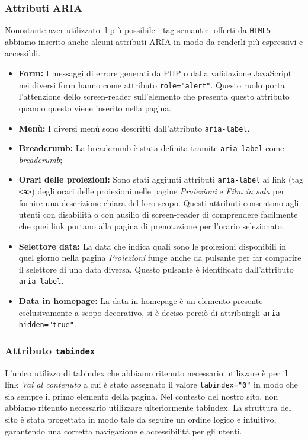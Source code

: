 \subsubsection{Attributi ARIA}
Nonostante aver utilizzato il più possibile i tag semantici offerti da \texttt{HTML5} abbiamo inserito anche alcuni attributi ARIA in modo da renderli più espressivi e accessibli.
\begin{itemize}
    \item \textbf{Form:} I messaggi di errore generati da PHP o dalla validazione JavaScript nei diversi form hanno come attributo \texttt{role="alert"}. Questo ruolo porta l'attenzione dello screen-reader sull'elemento che presenta questo attributo quando questo viene inserito nella pagina.
    \item \textbf{Menù:} I diversi menù sono descritti dall'attributo \texttt{aria-label}.
    \item \textbf{Breadcrumb:} La breadcrumb è stata definita tramite \texttt{aria-label} come \textit{breadcrumb};
    \item \textbf{Orari delle proiezioni:} Sono stati aggiunti attributi \texttt{aria-label} ai link (tag \texttt{<a>}) degli orari delle proiezioni nelle pagine \textit{Proiezioni} e \textit{Film in sala} per fornire una descrizione chiara del loro scopo. Questi attributi consentono agli utenti con disabilità o con ausilio di screen-reader di comprendere facilmente che quei link portano alla pagina di prenotazione per l'orario selezionato.
    \item \textbf{Selettore data:} La data che indica quali sono le proiezioni disponibili in quel giorno nella pagina \textit{Proiezioni} funge anche da pulsante per far comparire il selettore di una data diversa. Questo pulsante è identificato dall'attributo \texttt{aria-label}.
    \item \textbf{Data in homepage:} La data in homepage è un elemento presente esclusivamente a scopo decorativo, si è deciso perciò di attribuirgli \texttt{aria-hidden="true"}.
\end{itemize}

\subsubsection{Attributo \texttt{tabindex}}
L’unico utilizzo di tabindex che abbiamo ritenuto necessario utilizzare è per il link \textit{Vai al contenuto} a cui è stato assegnato il valore \texttt{tabindex="0"} in modo che sia sempre il primo elemento della pagina. Nel contesto del nostro sito, non abbiamo ritenuto necessario utilizzare ulteriormente tabindex. La struttura del sito è stata progettata in modo tale da seguire un ordine logico e intuitivo, garantendo una corretta navigazione e accessibilità per gli utenti.


